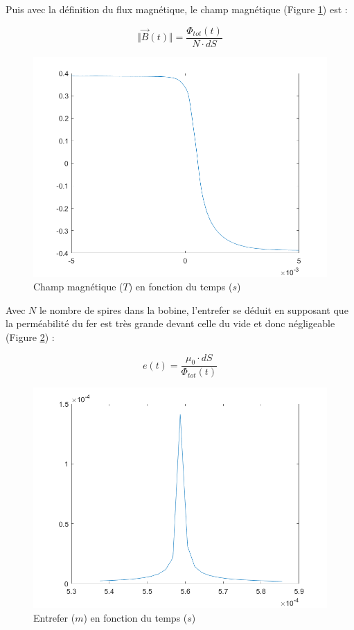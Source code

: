 \documentclass{rapportENS}
\begin{document}
 Puis avec la définition du flux magnétique, le champ magnétique (Figure \ref{champ}) est : 
 
 \vspace{0.1cm}
 \begin{equation}
 \Vert \overrightarrow{B}(t) \Vert = \frac{\Phi_{tot}(t)}{N \cdot dS}
 \end{equation}
 
 \begin{figure}[h!]
 \includegraphics[width = .5\linewidth]{champmag.png}
 \centering
 \vspace{0.5cm}
 \caption{Champ magnétique ($T$) en fonction du temps ($s$)}
 \label{champ}
 \end{figure}
 \vspace{0.2cm}
 
 Avec $N$ le nombre de spires dans la bobine, l'entrefer se déduit en supposant que la perméabilité du fer est très grande devant celle du vide et donc négligeable (Figure \ref{entrefer}) :

 \vspace{0.1cm}
 \begin{equation}
 e(t) = \frac{\mu_0 \cdot dS}{\Phi_{tot}(t)}
 \end{equation}
 
 \begin{figure}[h!]
 \includegraphics[width = .5\linewidth]{entrefer.png}
 \centering
 \vspace{0.5cm}
 \caption{Entrefer ($m$) en fonction du temps ($s$)}
 \label{entrefer}
 \end{figure}
 \vspace{1cm}
 
\end{document}
